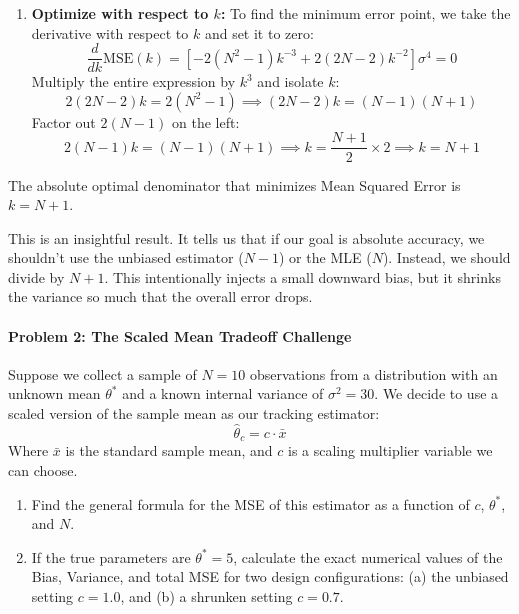 \documentclass{article}
\begin{document}
\begin{enumerate}
    \item \textbf{Optimize with respect to $k$:}
    To find the minimum error point, we take the derivative with respect to $k$ and set it to zero:
    \begin{equation}
    \frac{d}{dk}\text{MSE}(k) = \left[ -2(N^2 - 1)k^{-3} + 2(2N - 2)k^{-2} \right] \sigma^4 = 0
    \end{equation}
    Multiply the entire expression by $k^3$ and isolate $k$:
    \begin{equation}
    2(2N - 2)k = 2(N^2 - 1) \implies (2N - 2)k = (N-1)(N+1)
    \end{equation}
    Factor out $2(N-1)$ on the left:
    \begin{equation}
    2(N-1)k = (N-1)(N+1) \implies k = \frac{N+1}{2} \times 2 \implies k = N + 1
    \end{equation}
\end{enumerate}
The absolute optimal denominator that minimizes Mean Squared Error is $k = N + 1$. 

This is an insightful result. It tells us that if our goal is absolute accuracy, we shouldn't use the unbiased estimator ($N-1$) or the MLE ($N$). Instead, we should divide by $N+1$. This intentionally injects a small downward bias, but it shrinks the variance so much that the overall error drops.

\paragraph{Problem 2: The Scaled Mean Tradeoff Challenge}
Suppose we collect a sample of $N=10$ observations from a distribution with an unknown mean $\theta^*$ and a known internal variance of $\sigma^2 = 30$. We decide to use a scaled version of the sample mean as our tracking estimator:
\begin{equation}
\hat{\theta}_c = c \cdot \bar{x}
\end{equation}
Where $\bar{x}$ is the standard sample mean, and $c$ is a scaling multiplier variable we can choose. 
\begin{enumerate}
    \item Find the general formula for the MSE of this estimator as a function of $c$, $\theta^*$, and $N$.
    \item If the true parameters are $\theta^* = 5$, calculate the exact numerical values of the Bias, Variance, and total MSE for two design configurations: (a) the unbiased setting $c = 1.0$, and (b) a shrunken setting $c = 0.7$.
\end{enumerate}
\end{document}
